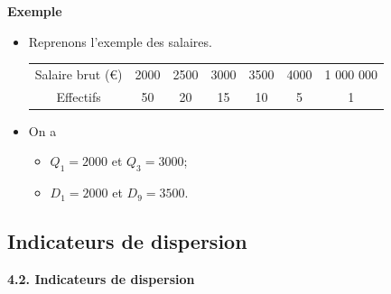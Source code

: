 \documentclass[aspectratio=169,xcolor=dvipsnames]{beamer}
\begin{document}
\begin{frame}
	\begin{exampleblock}{\textbf{Exemple}}
	\begin{itemize}
	\item Reprenons l'exemple des salaires.
		\begin{center}
			\begin{tabular}{ccccccc}
			\hline
			Salaire brut (\euro) & 2000 & 2500 & 3000 & 3500 & 4000 & 1 000 000 \\
			Effectifs & 50 & 20 & 15 & 10 & 5 & 1 \\
			\hline
			\end{tabular}
		\end{center}
	\item On a
		\begin{itemize}
		\item $Q_1 = 2000$ et $Q_3=3000$;
		\item $D_1 = 2000$ et $D_9=3500$.
		\end{itemize}
	\end{itemize}
	\end{exampleblock}
\end{frame}

\subsection{Indicateurs de dispersion}

\begin{frame}[plain]

\vfill

\begin{center}
{\huge \textcolor{nyubluedark}{\textbf{4.2. Indicateurs de dispersion}}}
\end{center}

\vfill

\end{frame}
\end{document}
